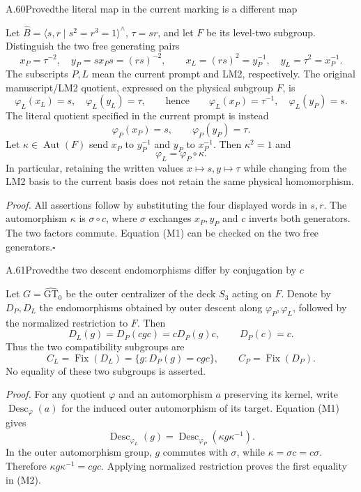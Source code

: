 \begin{statement}{A.60}{Proved}{the literal map in the current marking is a different map}
\end{statement}
Let $\widehat B=\langle s,r\mid s^2=r^3=1\rangle^{\wedge}$,
$\tau=sr$, and let $F$ be its level-two subgroup.  Distinguish the
two free generating pairs
\[
 x_P=\tau^{-2},\quad y_P=sx_Ps=(rs)^{-2},\qquad
 x_L=(rs)^2=y_P^{-1},\quad y_L=\tau^2=x_P^{-1}.
\]
The subscripts $P,L$ mean the current prompt and LM2, respectively.
The original manuscript/LM2 quotient, expressed on the physical subgroup
$F$, is
\[
 \varphi_L(x_L)=s,\quad\varphi_L(y_L)=\tau,
 \qquad\text{hence}\qquad
 \varphi_L(x_P)=\tau^{-1},\quad\varphi_L(y_P)=s.
\]
The literal quotient specified in the current prompt is instead
\[
 \varphi_P(x_P)=s,\qquad\varphi_P(y_P)=\tau.
\]
Let $\kappa\in\operatorname{Aut}(F)$ send $x_P$ to $y_P^{-1}$ and
$y_P$ to $x_P^{-1}$. Then $\kappa^2=1$ and
\[
                 \varphi_L=\varphi_P\circ\kappa.                 \tag{M1}
\]
In particular, retaining the written values $x\mapsto s,y\mapsto\tau$
while changing from the LM2 basis to the current basis does not retain
the same physical homomorphism.

\emph{Proof.} All assertions follow by substituting the four displayed
words in $s,r$. The automorphism $\kappa$ is $\sigma\circ c$, where
$\sigma$ exchanges $x_P,y_P$ and $c$ inverts both generators.
The two factors commute.  Equation (M1) can be checked on the two
free generators.\hfill$\square$

\begin{statement}{A.61}{Proved}{the two descent endomorphisms differ by conjugation by $c$}
\end{statement}
Let $G=\widehat{\mathrm{GT}}_0$ be the outer centralizer of the deck
$S_3$ acting on $F$. Denote by $D_P,D_L$ the endomorphisms obtained by
outer descent along $\varphi_P,\varphi_L$, followed by the normalized
restriction to $F$. Then
\[
 D_L(g)=D_P(cgc)=cD_P(g)c,\qquad
 D_P(c)=c.                                                       \tag{M2}
\]
Thus the two compatibility subgroups are
\[
 C_L=\operatorname{Fix}(D_L)
     =\{g:D_P(g)=cgc\},\qquad
 C_P=\operatorname{Fix}(D_P).
\]
No equality of these two subgroups is asserted.

\emph{Proof.} For any quotient $\varphi$ and an automorphism $a$
preserving its kernel, write $\operatorname{Desc}_{\varphi}(a)$ for
the induced outer automorphism of its target. Equation (M1) gives
\[
 \operatorname{Desc}_{\varphi_L}(g)
 =\operatorname{Desc}_{\varphi_P}(\kappa g\kappa^{-1}).
\]
In the outer automorphism group, $g$ commutes with $\sigma$, while
$\kappa=\sigma c=c\sigma$. Therefore
$\kappa g\kappa^{-1}=cgc$. Applying normalized restriction proves
the first equality in (M2).

